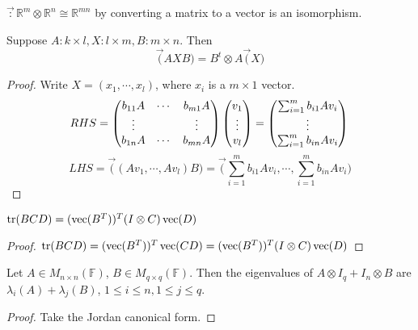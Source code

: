 \begin{definition}[vectorization]
$\vec:\mathbb{R}^{m}\otimes\mathbb{R}^{n}\cong\mathbb{R}^{mn}$ by converting a matrix to a vector is an isomorphism.
\end{definition}
\begin{theorem}
Suppose $A:k\times l, X:l\times m, B:m\times n$. Then
\[\vec(AXB)=B^{t}\otimes A\vec(X)\]
\end{theorem}
\begin{proof}
Write $X=(x_1,\cdots,x_l)$, where $x_i$ is a $m\times 1$ vector.
\[
RHS=\begin{pmatrix}
 b_{11}A & \cdots & b_{m1}A\\
 \vdots &  & \vdots\\
  b_{1n}A& \cdots & b_{mn}A
\end{pmatrix}
\begin{pmatrix}
 v_1\\
 \vdots\\
v_l
\end{pmatrix}=\begin{pmatrix}
\sum_{i=1}^{m} b_{i1}Av_i \\
 \vdots \\
\sum_{i=1}^{m} b_{in}Av_i
\end{pmatrix}\\\]
\[LHS=\vec((Av_1,\cdots,Av_l)B)=\vec(\sum_{i=1}^{m} b_{i1}Av_i ,\cdots,\sum_{i=1}^{m} b_{in}Av_i)\]
\end{proof}
\begin{lemma}
$\operatorname{tr}(BCD)=(\operatorname{vec}(B^T))^T(I\otimes C)\operatorname{vec}(D)$
\end{lemma}
\begin{proof}
$\operatorname{tr}(BCD)=(\operatorname{vec}(B^T))^T\operatorname{vec}(CD)=(\operatorname{vec}(B^T))^T(I\otimes C)\operatorname{vec}(D)$
\end{proof}




\begin{theorem}
Let $A\in M_{n\times n}(\mathbb{F})$, $B\in M_{q\times q}(\mathbb{F})$. Then the eigenvalues of $A\otimes I_q+I_n\otimes B$ are $\lambda_i(A)+\lambda_j(B)$, $1\le i\le n, 1\le j\le q$.
\end{theorem}
\begin{proof}
Take the Jordan canonical form.
\end{proof}

\begin{theorem}

\end{theorem}
